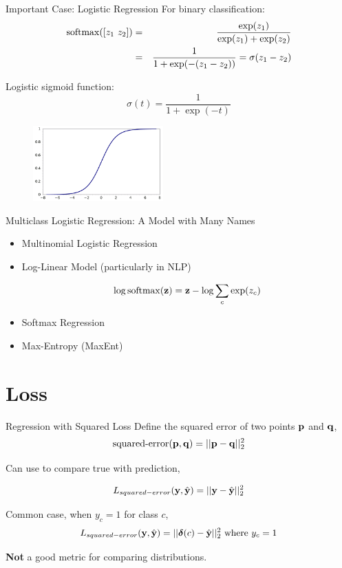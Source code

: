 \documentclass{beamer}
\begin{document}
\begin{frame}{Important Case: Logistic Regression}
  For binary classification:
  \begin{eqnarray*}
   \softmax([z_1\ z_2]) &=& \frac{\exp(z_1)}{\exp(z_1) + \exp(z_2)} \\
 &=& \frac{1}{1 + \exp(-(z_1-z_2))} = \sigma(z_1 -z_2)
  \end{eqnarray*}

  Logistic sigmoid function:
  \[\sigma(t) = \frac{1}{1 + \exp(-t)} \]
  \begin{figure}
    \centering
    \includegraphics[width=5cm]{sigmoid}
  \end{figure}
\end{frame}

\begin{frame}{Multiclass Logistic Regression: A Model with Many Names}
  \begin{itemize}
  \item  Multinomial Logistic Regression


  \item Log-Linear Model (particularly in NLP)
    
    \[\log \softmax(\boldz) = \boldz - \log \sum_{c} \exp(z_c)  \]

    
  \item Softmax Regression
    
    
  \item Max-Entropy (MaxEnt)
    
    
  \end{itemize}
\end{frame}

\section{Loss}

\begin{frame}{Regression with Squared Loss }
  Define the squared error of two points $\mathbf{p}$ and $\mathbf{q}$, 
  \[ \textrm{squared-error}(\mathbf{p}, \mathbf{q})= ||\mathbf{p} - \mathbf{q}||^2_2  \]

  Can use to compare true with prediction,

  \[L_{squared-error}(\mathbf{y}, \hat{\mathbf{y}}) = ||\mathbf{y} - \hat{\mathbf{y}}||^2_2 \]

  Common case, when $y_c = 1$ for class $c$,
  \[L_{squared-error}(\mathbf{y}, \hat{\mathbf{y}}) = ||\boldsymbol{\delta}(c) - \hat{\mathbf{y}} ||_2^2  \mathrm{\ where\ }y_c = 1 \]

  \textbf{Not} a good metric for comparing distributions.
\end{frame}
\end{document}
